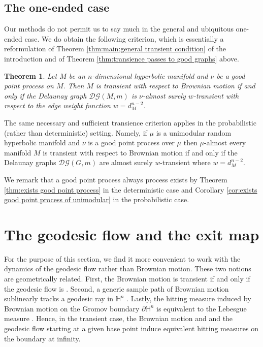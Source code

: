\documentclass{amsart}
\newcommand{\HH}{\mathbb{H}}
\newcommand{\DelanGraph}{\mathcal{DG}}
\theoremstyle{plain}
\newtheorem{theorem}{Theorem}[section]
\numberwithin{equation}{section}
\theoremstyle{definition}
\begin{document}



\subsection{The one-ended case}
Our methods do not permit us to say much in the general and ubiquitous one-ended case. We do obtain the following criterion, which is essentially a reformulation of Theorem \ref{thm:main:general transient condition} of the introduction and of Theorem \ref{thm:transience passes to good graphs} above.

\begin{theorem}
\label{thm:criterion in one-ended case}
Let $M$ be an $n$-dimensional hyperbolic manifold and $\nu$ be a good point process on $M$. Then $M$ is transient with respect to Brownian motion if and only if the Delaunay graph $\DelanGraph(M,m)$ is $\nu$-almost surely $w$-transient with respect to the edge weight function $w = d_M^{n-2}$.
\end{theorem}


The same necessary and sufficient transience criterion applies in the probabilistic (rather than deterministic) setting. Namely, if $\mu$ is a unimodular random hyperbolic manifold and $\nu$ is a good point process over $\mu$ then $\mu$-almost every manifold $M$ is transient with respect to Brownian motion if and only if the Delaunay graphs $\DelanGraph(G,m)$ are almost surely $w$-transient where $w=d_M^{n-2}$.

We remark that a good point process  always process exists by Theorem \ref{thm:exists good point process} in the deterministic case and Corollary \ref{cor:exists good point process of unimodular} in the probabilistic case.

\section{The geodesic flow and the exit map}
\label{sec:ends and entropy}

For the purpose of this section, we find it more convenient to work with the dynamics of the geodesic flow rather than Brownian motion. These two notions are geometrically related. First, the Brownian motion is transient if and only if the geodesic flow is \cite{sullivan1981ergodic}. Second, a generic sample path of  Brownian motion sublinearly tracks a geodesic ray in $\HH^n$ \cite{blachere2011harmonic}. %
Lastly, the hitting measure induced by Brownian motion on the Gromov boundary $\partial \HH^n$ is equivalent to the Lebesgue measure \cite[Appendix B]{quint2006overview}. %
Hence, in the transient case, the Brownian motion and and the geodesic flow starting at a given base point induce equivalent hitting measures on the boundary at infinity.
\end{document}

